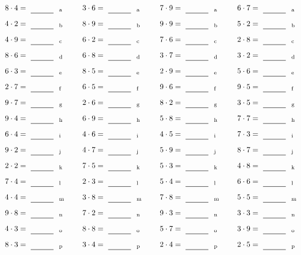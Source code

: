 \documentclass
[
  draft    = true,
  fontsize = 11pt,
  parskip  = half-
]
{scrartcl}
\begin{document}
\par\vfill\par
\begin{align*}
    \pline{8\cdot4}&=\rline{a}
  & \pline{3\cdot6}&=\rline{a}
  & \pline{7\cdot9}&=\rline{a}
  & \pline{6\cdot7}&=\rline{a} \\[1ex]
    \pline{4\cdot2}&=\rline{b}
  & \pline{8\cdot9}&=\rline{b}
  & \pline{9\cdot9}&=\rline{b}
  & \pline{5\cdot2}&=\rline{b} \\[1ex]
    \pline{4\cdot9}&=\rline{c}
  & \pline{6\cdot2}&=\rline{c}
  & \pline{7\cdot6}&=\rline{c}
  & \pline{2\cdot8}&=\rline{c} \\[1ex]
    \pline{8\cdot6}&=\rline{d}
  & \pline{6\cdot8}&=\rline{d}
  & \pline{3\cdot7}&=\rline{d}
  & \pline{3\cdot2}&=\rline{d} \\[1ex]
    \pline{6\cdot3}&=\rline{e}
  & \pline{8\cdot5}&=\rline{e}
  & \pline{2\cdot9}&=\rline{e}
  & \pline{5\cdot6}&=\rline{e} \\[1ex]
    \pline{2\cdot7}&=\rline{f}
  & \pline{6\cdot5}&=\rline{f}
  & \pline{9\cdot6}&=\rline{f}
  & \pline{9\cdot5}&=\rline{f} \\[1ex]
    \pline{9\cdot7}&=\rline{g}
  & \pline{2\cdot6}&=\rline{g}
  & \pline{8\cdot2}&=\rline{g}
  & \pline{3\cdot5}&=\rline{g} \\[1ex]
    \pline{9\cdot4}&=\rline{h}
  & \pline{6\cdot9}&=\rline{h}
  & \pline{5\cdot8}&=\rline{h}
  & \pline{7\cdot7}&=\rline{h} \\[1ex]
    \pline{6\cdot4}&=\rline{i}
  & \pline{4\cdot6}&=\rline{i}
  & \pline{4\cdot5}&=\rline{i}
  & \pline{7\cdot3}&=\rline{i} \\[1ex]
    \pline{9\cdot2}&=\rline{j}
  & \pline{4\cdot7}&=\rline{j}
  & \pline{5\cdot9}&=\rline{j}
  & \pline{8\cdot7}&=\rline{j} \\[1ex]
    \pline{2\cdot2}&=\rline{k}
  & \pline{7\cdot5}&=\rline{k}
  & \pline{5\cdot3}&=\rline{k}
  & \pline{4\cdot8}&=\rline{k} \\[1ex]
    \pline{7\cdot4}&=\rline{l}
  & \pline{2\cdot3}&=\rline{l}
  & \pline{5\cdot4}&=\rline{l}
  & \pline{6\cdot6}&=\rline{l} \\[1ex]
    \pline{4\cdot4}&=\rline{m}
  & \pline{3\cdot8}&=\rline{m}
  & \pline{7\cdot8}&=\rline{m}
  & \pline{5\cdot5}&=\rline{m} \\[1ex]
    \pline{9\cdot8}&=\rline{n}
  & \pline{7\cdot2}&=\rline{n}
  & \pline{9\cdot3}&=\rline{n}
  & \pline{3\cdot3}&=\rline{n} \\[1ex]
    \pline{4\cdot3}&=\rline{o}
  & \pline{8\cdot8}&=\rline{o}
  & \pline{5\cdot7}&=\rline{o}
  & \pline{3\cdot9}&=\rline{o} \\[1ex]
    \pline{8\cdot3}&=\rline{p}
  & \pline{3\cdot4}&=\rline{p}
  & \pline{2\cdot4}&=\rline{p}
  & \pline{2\cdot5}&=\rline{p}
\end{align*}
\end{document}
